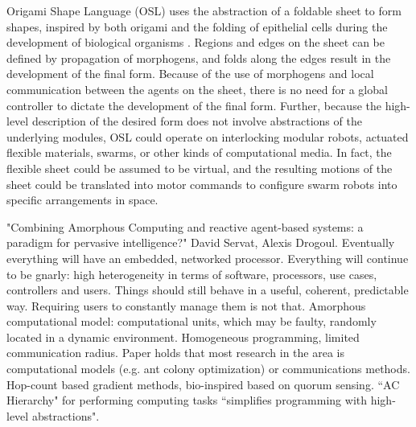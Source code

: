\documentclass[]{article}
\begin{document}
Origami Shape Language (OSL) uses the abstraction of a foldable sheet to form shapes, inspired by both origami and the folding of epithelial cells during the development of biological organisms \cite{nagpal2004engineering, nagpal2001programmable}.
Regions and edges on the sheet can be defined by propagation of morphogens, and folds along the edges result in the development of the final form.
Because of the use of morphogens and local communication between the agents on the sheet, there is no need for a global controller to dictate the development of the final form. 
Further, because the high-level description of the desired form does not involve abstractions of the underlying modules, OSL could operate on interlocking modular robots, actuated flexible materials, swarms, or other kinds of computational media. 
In fact, the flexible sheet could be assumed to be virtual, and the resulting motions of the sheet could be translated into motor commands to configure swarm robots into specific arrangements in space. 


"Combining Amorphous Computing and reactive agent-based systems: a paradigm for pervasive intelligence?" David Servat, Alexis Drogoul. Eventually everything will have an embedded, networked processor. Everything will continue to be gnarly: high heterogeneity in terms of software, processors, use cases, controllers and users. Things should still behave in a useful, coherent, predictable way. Requiring users to constantly manage them is not that. Amorphous computational model: computational units, which may be faulty, randomly located in a dynamic environment. Homogeneous programming, limited communication radius. Paper holds that most research in the area is computational models (e.g. ant colony optimization) or communications methods. Hop-count based gradient methods, bio-inspired based on quorum sensing. ``AC Hierarchy" for performing computing tasks ``simplifies programming with high-level abstractions". 
\end{document}
